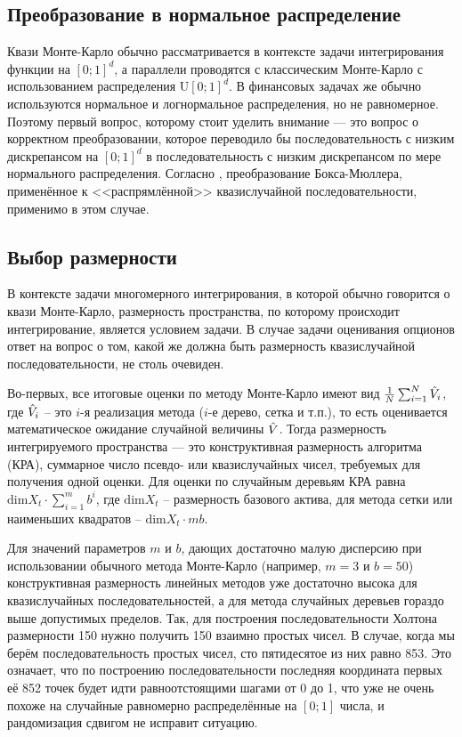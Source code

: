 \subsection{Преобразование в нормальное распределение} %
\label{sub:qmc:option_pricing:uniform_normal_transform}

Квази Монте-Карло обычно рассматривается в контексте задачи интегрирования функции на $\left[0;1\right]^d$, а параллели проводятся с классическим Монте-Карло с использованием распределения $\mathrm U\left[0;1\right]^d$. В финансовых задачах же обычно используются нормальное и логнормальное распределения, но не равномерное. Поэтому первый вопрос, которому стоит уделить внимание --- это вопрос о корректном преобразовании, которое переводило бы последовательность с низким дискрепансом на $\left[0;1\right]^d$ в последовательность с низким дискрепансом по мере нормального распределения. Согласно \cite{Oekten2011}, преобразование Бокса-Мюллера, применённое к <<распрямлённой>> квазислучайной последовательности, применимо в этом случае.


\subsection{Выбор размерности} %
\label{sub:qmc:option_pricing:choice_of_dimension}

В контексте задачи многомерного интегрирования, в которой обычно говорится о квази Монте-Карло, размерность пространства, по которому происходит интегрирование, является условием задачи. В случае задачи оценивания опционов ответ на вопрос о том, какой же должна быть размерность квазислучайной последовательности, не столь очевиден.

Во-первых, все итоговые оценки по методу Монте-Карло имеют вид $\frac{1}{N}\sum_{i=1}^N \hat{V}_i$, где $\hat{V}_i$ -- это $i$-я реализация метода ($i$-е дерево, сетка и т.п.), то есть оценивается математическое ожидание случайной величины $\hat{V}$. Тогда размерность интегрируемого пространства --- это конструктивная размерность алгоритма (КРА), суммарное число псевдо- или квазислучайных чисел, требуемых для получения одной оценки. Для оценки по случайным деревьям КРА равна $\mathrm{dim} X_t \cdot \sum_{i=1}^m b^i$, где $\mathrm{dim} X_t$ -- размерность базового актива, для метода сетки или наименьших квадратов -- $\mathrm{dim} X_t \cdot mb$.

Для значений параметров $m$ и $b$, дающих достаточно малую дисперсию при использовании обычного метода Монте-Карло (например, $m = 3$ и $b = 50$) конструктивная размерность линейных методов уже достаточно высока для квазислучайных последовательностей, а для метода случайных деревьев гораздо выше допустимых пределов. Так, для построения последовательности Холтона размерности 150 нужно получить 150 взаимно простых чисел. В случае, когда мы берём последовательность простых чисел, сто пятидесятое из них равно 853. Это означает, что по построению последовательности последняя координата первых её 852 точек будет идти равноотстоящими шагами от 0 до 1, что уже не очень похоже на случайные равномерно распределённые на $\left[0; 1\right]$ числа, и рандомизация сдвигом не исправит ситуацию.

